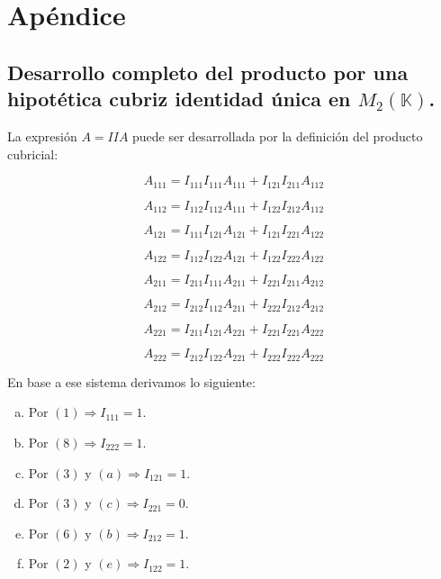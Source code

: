 \documentclass[a4paper, titlepage]{article}
\begin{document}
\newpage
\appendix

\section{Apéndice}

\subsection{Desarrollo completo del producto por una hipotética cubriz identidad única en $M_2 (\mathbb{K})$.}

La expresión $A = IIA$ puede ser desarrollada por la definición del producto cubricial:

\begin{equation}
A_{111} = I_{111} I_{111} A_{111} + I_{121} I_{211} A_{112}
\end{equation}

\begin{equation}
A_{112} = I_{112} I_{112} A_{111} + I_{122} I_{212} A_{112}
\end{equation}

\begin{equation}
A_{121} = I_{111} I_{121} A_{121} + I_{121} I_{221} A_{122}
\end{equation}

\begin{equation}
A_{122} = I_{112} I_{122} A_{121} + I_{122} I_{222} A_{122}
\end{equation}

\begin{equation}
A_{211} = I_{211} I_{111} A_{211} + I_{221} I_{211} A_{212}
\end{equation}

\begin{equation}
A_{212} = I_{212} I_{112} A_{211} + I_{222} I_{212} A_{212}
\end{equation}

\begin{equation}
A_{221} = I_{211} I_{121} A_{221} + I_{221} I_{221} A_{222}
\end{equation}

\begin{equation}
A_{222} = I_{212} I_{122} A_{221} + I_{222} I_{222} A_{222}
\end{equation}

En base a ese sistema derivamos lo siguiente:

\begin{enumerate}[(a)]
	\item Por $(1) \Rightarrow I_{111} = 1$.
	\item Por $(8) \Rightarrow I_{222} = 1$.
	\item Por $(3)$ y $(a) \Rightarrow I_{121} = 1$.
	\item Por $(3)$ y $(c) \Rightarrow I_{221} = 0$.
	\item Por $(6)$ y $(b) \Rightarrow I_{212} = 1$.
	\item Por $(2)$ y $(e) \Rightarrow I_{122} = 1$.
\end{enumerate}
\end{document}
